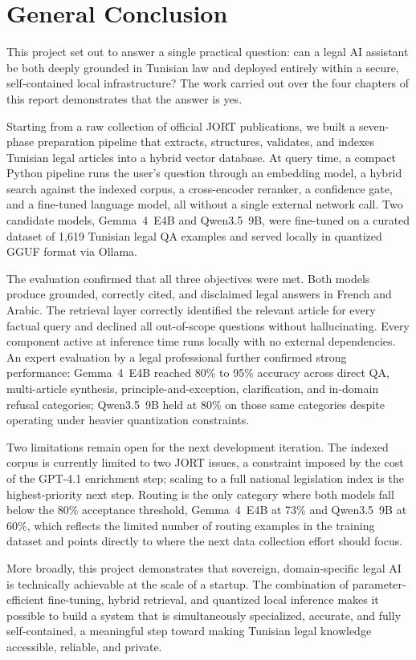 \chapter*{General Conclusion}

This project set out to answer a single practical question: can a legal \ac{AI}
assistant be both deeply grounded in Tunisian law and deployed entirely within a
secure, self-contained local infrastructure? The work carried out over the four
chapters of this report demonstrates that the answer is yes.

Starting from a raw collection of official \ac{JORT} publications, we built a
seven-phase preparation pipeline that extracts, structures, validates, and indexes
Tunisian legal articles into a hybrid vector database. At query time, a compact
Python pipeline runs the user's question through an embedding model, a hybrid
search against the indexed corpus, a cross-encoder reranker, a confidence gate,
and a fine-tuned language model, all without a single external network call. Two
candidate models, Gemma~4~E4B and Qwen3.5~9B, were fine-tuned on a curated
dataset of 1,619 Tunisian legal \ac{QA} examples and served locally in quantized
\ac{GGUF} format via Ollama.

The evaluation confirmed that all three objectives were met. Both models produce
grounded, correctly cited, and disclaimed legal answers in French and Arabic.
The retrieval layer correctly identified the relevant article for every factual
query and declined all out-of-scope questions without hallucinating. Every
component active at inference time runs locally with no external dependencies.
An expert evaluation by a legal professional further confirmed strong performance:
Gemma~4~E4B reached 80\% to 95\% accuracy across direct \ac{QA}, multi-article
synthesis, principle-and-exception, clarification, and in-domain refusal
categories; Qwen3.5~9B held at 80\% on those same categories despite operating
under heavier quantization constraints.

Two limitations remain open for the next development iteration. The indexed corpus
is currently limited to two \ac{JORT} issues, a constraint imposed by the cost of
the GPT-4.1 enrichment step; scaling to a full national legislation index is the
highest-priority next step. Routing is the only category where both models fall
below the 80\% acceptance threshold, Gemma~4~E4B at 73\% and Qwen3.5~9B at 60\%,
which reflects the limited number of routing examples in the training dataset and
points directly to where the next data collection effort should focus.

More broadly, this project demonstrates that sovereign, domain-specific legal
\ac{AI} is technically achievable at the scale of a startup. The combination of
parameter-efficient fine-tuning, hybrid retrieval, and quantized local inference
makes it possible to build a system that is simultaneously specialized, accurate,
and fully self-contained, a meaningful step toward making Tunisian legal knowledge
accessible, reliable, and private.
